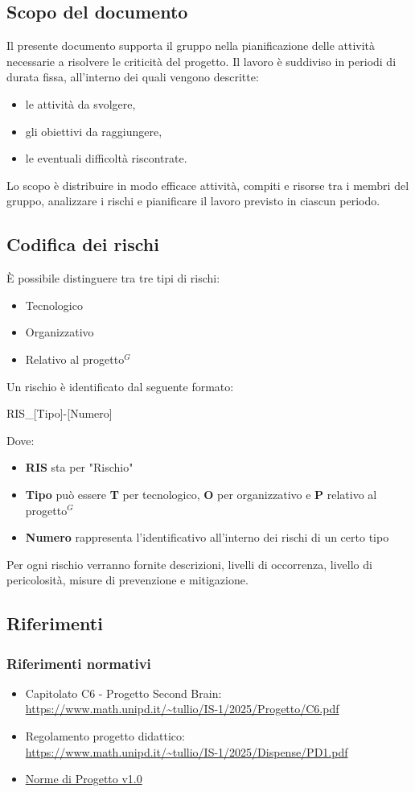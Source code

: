 \documentclass[a4paper,10pt]{article}
\begin{document}
\subsection{Scopo del documento}
Il presente documento supporta il gruppo nella pianificazione delle attività necessarie a risolvere le criticità del progetto. Il lavoro è suddiviso in periodi di durata fissa, all’interno dei quali vengono descritte:
\begin{itemize}
  \item le attività da svolgere,
  \item gli obiettivi da raggiungere,
  \item le eventuali difficoltà riscontrate.
\end{itemize}
Lo scopo è distribuire in modo efficace attività, compiti e risorse tra i membri del gruppo, analizzare i rischi e pianificare il lavoro previsto in ciascun periodo.

\subsection{Codifica dei rischi}
È possibile distinguere tra tre tipi di rischi: 
\begin{itemize}
  \item Tecnologico
  \item Organizzativo
  \item Relativo al progetto$^G$
\end{itemize}
Un rischio è identificato dal seguente formato:
\begin{center}
  RIS\_[Tipo]-[Numero]
\end{center}
Dove: 
\begin{itemize}
  \item \textbf{RIS} sta per "Rischio"
  \item \textbf{Tipo} può essere \textbf{T} per tecnologico, \textbf{O} per organizzativo e \textbf{P} relativo al progetto$^G$
  \item \textbf{Numero} rappresenta l'identificativo all'interno dei rischi di un certo tipo
\end{itemize}
Per ogni rischio verranno fornite descrizioni, livelli di occorrenza, livello di pericolosità, misure di prevenzione e mitigazione.

\subsection{Riferimenti}
\subsubsection{Riferimenti normativi}
\begin{itemize}
  \item Capitolato C6 - Progetto Second Brain: \\  \url{https://www.math.unipd.it/~tullio/IS-1/2025/Progetto/C6.pdf}
  \item Regolamento progetto didattico: \\ \url{https://www.math.unipd.it/~tullio/IS-1/2025/Dispense/PD1.pdf}
  \item \href{https://tool-8.github.io/Documentazione-SWE/}{Norme di Progetto v1.0}
\end{itemize}
\end{document}
